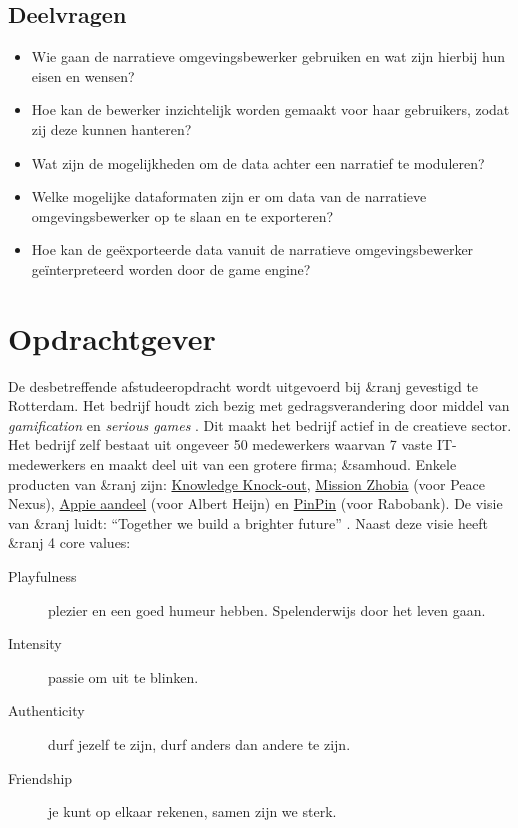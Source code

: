 \documentclass{report}
\newcommand{\organisation}{\&ranj}
\begin{document}
\subsection{Deelvragen} %
\begin{itemize}
\item Wie gaan de narratieve omgevingsbewerker gebruiken en wat zijn hierbij hun eisen en wensen?
\item Hoe kan de bewerker inzichtelijk worden gemaakt voor haar gebruikers, zodat zij deze kunnen hanteren?
\item Wat zijn de mogelijkheden om de data achter een narratief te moduleren?
\item Welke mogelijke dataformaten zijn er om data van de narratieve omgevingsbewerker op te slaan en te exporteren?
\item Hoe kan de ge{\"e}xporteerde data vanuit de narratieve omgevingsbewerker ge{\"i}nterpreteerd worden door de game engine?
\end{itemize}

\section{Opdrachtgever}
De desbetreffende afstudeeropdracht wordt uitgevoerd bij \organisation{} gevestigd te Rotterdam. Het bedrijf houdt zich bezig met gedragsverandering door middel van \emph{gamification} en \emph{serious games} \cite{websiteranj}. Dit maakt het bedrijf actief in de creatieve sector.
Het bedrijf zelf bestaat uit ongeveer 50 medewerkers waarvan 7 vaste IT-medewerkers \cite{linkedinranj} en maakt deel uit van een grotere firma; \&samhoud. Enkele producten van \organisation{} zijn: \href{https://ranj.com/products#knowledge-knock-out}{Knowledge Knock-out}, \href{https://ranj.com/projects/corporate/development#mission-zhobia}{Mission Zhobia} (voor Peace Nexus), \href{https://ranj.com/projects/corporate/development#appie-aandeel}{Appie aandeel} (voor Albert Heijn) en \href{https://ranj.com/projects/education#pinpin}{PinPin} (voor Rabobank).
De visie van \organisation{} luidt: ``Together we build a brighter future'' \cite{websiteranj}.
Naast deze visie heeft \organisation{} 4 core values:
\begin{description}
\item[Playfulness] plezier en een goed humeur hebben. Spelenderwijs door het leven gaan.
\item[Intensity] passie om uit te blinken.
\item[Authenticity] durf jezelf te zijn, durf anders dan andere te zijn.
\item[Friendship] je kunt op elkaar rekenen, samen zijn we sterk.
\end{description}
\end{document}
